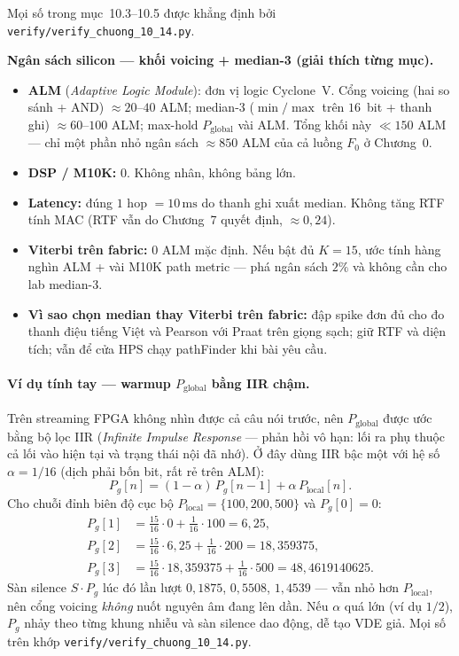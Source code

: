 Mọi số trong mục~10.3--10.5 được khẳng định bởi \texttt{verify/verify\_chuong\_10\_14.py}.

\begin{costbox}
\textbf{Ngân sách silicon --- khối voicing + median-3 (giải thích từng mục).}
\begin{itemize}[leftmargin=1.2em]
    \item \textbf{ALM} (\emph{Adaptive Logic Module}): đơn vị logic Cyclone~V. Cổng voicing (hai so sánh + AND) $\approx 20$--$40$ ALM; median-3 ($\min/\max$ trên $16$~bit + thanh ghi) $\approx 60$--$100$ ALM; max-hold $P_{\mathrm{global}}$ vài ALM. Tổng khối này $\ll 150$ ALM --- chỉ một phần nhỏ ngân sách $\approx 850$ ALM của cả luồng $F_0$ ở Chương~0.
    \item \textbf{DSP / M10K:} $0$. Không nhân, không bảng lớn.
    \item \textbf{Latency:} đúng $1$ hop $=10\,\text{ms}$ do thanh ghi xuất median. Không tăng RTF tính MAC (RTF vẫn do Chương~7 quyết định, $\approx 0{,}24$).
    \item \textbf{Viterbi trên fabric:} $0$ ALM mặc định. Nếu bật đủ $K{=}15$, ước tính hàng nghìn ALM + vài M10K path metric --- phá ngân sách $2\%$ và không cần cho lab median-3.
    \item \textbf{Vì sao chọn median thay Viterbi trên fabric:} đập spike đơn đủ cho đo thanh điệu tiếng Việt và Pearson với Praat trên giọng sạch; giữ RTF và diện tích; vẫn để cửa HPS chạy pathFinder khi bài yêu cầu.
\end{itemize}
\end{costbox}


\paragraph{Ví dụ tính tay --- warmup $P_{\mathrm{global}}$ bằng IIR chậm.}
Trên streaming FPGA không nhìn được cả câu nói trước, nên $P_{\mathrm{global}}$ được ước bằng bộ lọc IIR (\emph{Infinite Impulse Response} --- phản hồi vô hạn: lối ra phụ thuộc cả lối vào hiện tại và trạng thái nội đã nhớ). Ở đây dùng IIR bậc một với hệ số $\alpha=1/16$ (dịch phải bốn bit, rất rẻ trên ALM):
\begin{equation}
P_g[n]=(1-\alpha)\,P_g[n-1]+\alpha\,P_{\mathrm{local}}[n].
\end{equation}
Cho chuỗi đỉnh biên độ cục bộ $P_{\mathrm{local}}=\{100,200,500\}$ và $P_g[0]=0$:
\begin{align*}
P_g[1]&=\tfrac{15}{16}\cdot 0+\tfrac{1}{16}\cdot 100=6{,}25,\\
P_g[2]&=\tfrac{15}{16}\cdot 6{,}25+\tfrac{1}{16}\cdot 200=18{,}359375,\\
P_g[3]&=\tfrac{15}{16}\cdot 18{,}359375+\tfrac{1}{16}\cdot 500=48{,}4619140625.
\end{align*}
Sàn silence $S\cdot P_g$ lúc đó lần lượt $0{,}1875$, $0{,}5508$, $1{,}4539$ --- vẫn nhỏ hơn $P_{\mathrm{local}}$, nên cổng voicing \emph{không} nuốt nguyên âm đang lên dần. Nếu $\alpha$ quá lớn (ví dụ $1/2$), $P_g$ nhảy theo từng khung nhiễu và sàn silence dao động, dễ tạo VDE giả. Mọi số trên khớp \texttt{verify/verify\_chuong\_10\_14.py}.

